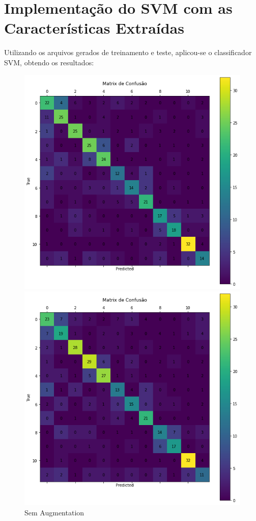 \documentclass[12pt]{article}
\begin{document}
\section{Implementação do SVM com as Características Extraídas}

Utilizando os arquivos gerados de treinamento e teste, aplicou-se o classificador SVM, obtendo os resultados:

\begin{figure}[!htb]
  \begin{minipage}{.47\textwidth}
    \centering
    \includegraphics[width=1.1\linewidth]{experiments/svm_aug/confusion_matrix.png}
    \caption{Sem Augmentation}\label{fig:experiment_svm_aug}
  \end{minipage}\hfill
  \begin{minipage}{.47\textwidth}
    \centering
    \includegraphics[width=1.1\linewidth]{experiments/svm_noaug/confusion_matrix.png}

\end{minipage}
\end{figure}
\end{document}

